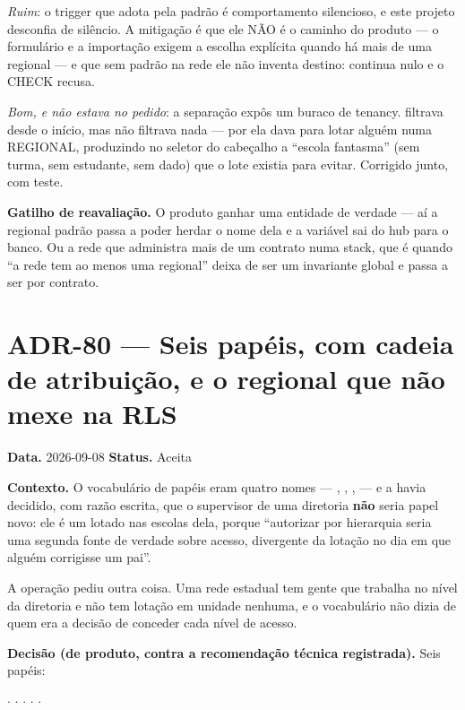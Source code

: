 \emph{Ruim}: o trigger que adota pela padrão é comportamento silencioso, e este
projeto desconfia de silêncio. A mitigação é que ele NÃO é o caminho do produto
--- o formulário e a importação exigem a escolha explícita quando há mais de uma
regional --- e que sem padrão na rede ele não inventa destino: 
continua nulo e o CHECK recusa.

\emph{Bom, e não estava no pedido}: a separação expôs um buraco de tenancy.
 filtrava  desde o início, mas
 não filtrava nada --- por ela dava para lotar
alguém numa REGIONAL, produzindo no seletor do cabeçalho a \enquote{escola
fantasma} (sem turma, sem estudante, sem dado) que o lote existia para evitar.
Corrigido junto, com teste.

\textbf{Gatilho de reavaliação.} O produto ganhar uma entidade  de
verdade --- aí a regional padrão passa a poder herdar o nome dela e a variável
 sai do hub para o banco. Ou a rede que administra mais de um
contrato numa stack, que é quando \enquote{a rede tem ao menos uma regional}
deixa de ser um invariante global e passa a ser por contrato.

\section{ADR-80 --- Seis papéis, com cadeia de atribuição, e o regional que não
mexe na RLS}
\label{adr:modelo-de-papeis}

\textbf{Data.} 2026-09-08 \quad \textbf{Status.} Aceita

\textbf{Contexto.} O vocabulário de papéis eram quatro nomes ---
, , ,  --- e a
 havia decidido, com razão escrita, que o supervisor de uma
diretoria \textbf{não} seria papel novo: ele é um  lotado nas escolas
dela, porque \enquote{autorizar por hierarquia seria uma segunda fonte de
verdade sobre acesso, divergente da lotação no dia em que alguém corrigisse um
pai}.

A operação pediu outra coisa. Uma rede estadual tem gente que trabalha no nível
da diretoria e não tem lotação em unidade nenhuma, e o vocabulário não dizia de
quem era a decisão de conceder cada nível de acesso.

\textbf{Decisão (de produto, contra a recomendação técnica registrada).} Seis
papéis:

\begin{center}
 $\cdot$  $\cdot$  $\cdot$
 $\cdot$  $\cdot$ 
\end{center}

